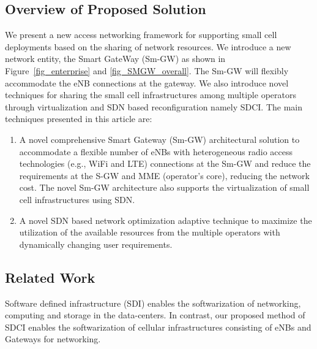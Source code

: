 \documentclass[journal,twoside,comsoc]{IEEEtran}
\begin{document}
\subsection{Overview of Proposed Solution}
We present a new access networking framework 
for supporting small cell
deployments based on the sharing of network resources.
We introduce a new network entity, the Smart GateWay (Sm-GW) 
as shown
in Figure~\ref{fig_enterprise} and \ref{fig_SMGW_overall}.
The Sm-GW will
flexibly accommodate the eNB connections at the gateway.
We also introduce novel techniques for sharing the
small cell infrastructures among multiple operators through virtualization
and SDN based reconfiguration namely SDCI.
The main techniques presented in this article are:
\begin{enumerate}
	\item A novel comprehensive Smart Gateway (Sm-GW) architectural
	solution to accommodate a flexible number of eNBs with
	heterogeneous radio access technologies (e.g., WiFi and LTE)
	connections at the Sm-GW and reduce the requirements at
	the S-GW and MME (operator's core), reducing the network cost.
	The novel \mbox{Sm-GW} architecture also supports the virtualization of small cell
	infrastructures using SDN.
	\item A novel SDN based network optimization adaptive technique to maximize
	the utilization of the available resources from 
	the multiple operators with dynamically changing user requirements.
\end{enumerate}

\subsection{Related Work}
Software defined infrastructure (SDI) \cite{lin2015monitoring, kang2013software,
	 kang2014software, kandiraju2014software, lin2014enabling} enables the
softwarization of networking, computing and storage in the data-centers. In
contrast, our proposed method of SDCI enables the softwarization of 
cellular infrastructures consisting of eNBs and Gateways for networking.
\end{document}
